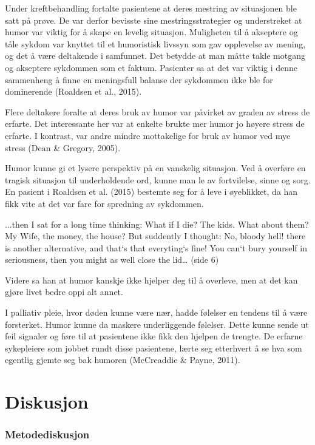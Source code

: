 Under kreftbehandling fortalte pasientene at deres mestring av situasjonen ble
satt på prøve. De var derfor bevisste sine mestringsstrategier og understreket
at humor var viktig for å skape en levelig situasjon. Muligheten til å
akseptere og tåle sykdom var knyttet til et humoristisk livssyn som gav
opplevelse av mening, og det å være deltakende i samfunnet. Det betydde at man
måtte takle motgang og akseptere sykdommen som et faktum. Pasienter sa at det
var viktig i denne sammenheng å finne en meningsfull balanse der sykdommen ikke
ble for dominerende (Roaldsen et al., 2015).

Flere deltakere foralte at deres bruk av humor var påvirket av graden av stress
de erfarte. Det interessante her var at enkelte brukte mer humor jo høyere
stress de erfarte. I kontrast, var andre mindre mottakelige for bruk av humor
ved mye stress (Dean \&{} Gregory, 2005).

Humor kunne gi et lysere perspektiv på en vanskelig situasjon. Ved å overføre
en tragisk situasjon til underholdende ord, kunne man le av fortvilelse, sinne
og sorg. En pasient i Roaldsen et al. (2015) bestemte seg for å leve i
øyeblikket, da han fikk vite at det var fare for spredning av sykdommen.

 ...then I sat for a long time thinking: What if I die? The kids. What about
 them? My Wife, the money, the house? But suddently I thought: No, bloody hell!
 there is another alternative, and that`s that everyting`s fine! You can`t bury
 yourself in seriousness, then you might as well close the lid… (side 6)

Videre sa han at humor kanskje ikke hjelper deg til å overleve, men at det kan
gjøre livet bedre oppi alt annet.

I palliativ pleie, hvor døden kunne være nær, hadde følelser en tendens til å
være forsterket. Humor kunne da maskere underliggende følelser. Dette kunne
sende ut feil signaler og føre til at pasientene ikke fikk den hjelpen de
trengte. De erfarne sykepleiere som jobbet rundt disse pasientene, lærte seg
etterhvert å se hva som egentlig  gjemte seg bak humoren (McCreaddie \&{} Payne,
2011).

\chapter{Diskusjon}

\subsection{Metodediskusjon}

